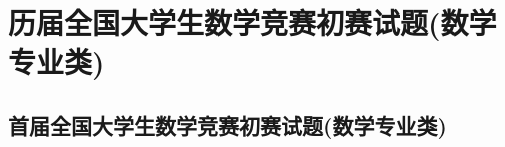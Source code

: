 \documentclass[loose]{ExBook}
\begin{document}


\maketitle 
 
%  

% 

\setcounter{page}{1}
\tableofcontents 
    
\clearpage 

\section{历届全国大学生数学竞赛初赛试题(数学专业类)}
\subsection{首届全国大学生数学竞赛初赛试题(数学专业类)}
\end{document}
